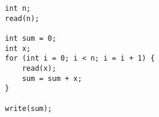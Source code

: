 \documentclass{article}[12pt]
\begin{document}
    \begin{tcolorbox}[
        standard jigsaw,
        title=P3. Compute the sum of $n$ elements,
        opacityback=0]
    \begin{verbatim}
        int n;
        read(n);

        int sum = 0;
        int x;
        for (int i = 0; i < n; i = i + 1) {
            read(x);
            sum = sum + x;
        }

        write(sum);
    \end{verbatim}
    \end{tcolorbox}

    \vspace{2em}
\end{document}
